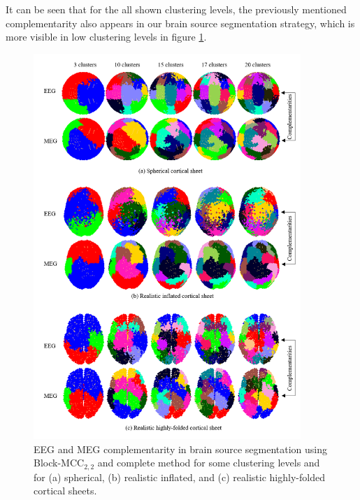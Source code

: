 It can be seen that for the all shown clustering levels, the previously mentioned complementarity also appears in our brain source segmentation strategy, which is more visible in low clustering levels in figure \ref{fig:EMEG_complementarities}.
\begin{figure}[!b]
\centering
\includegraphics[width=0.9\textwidth,keepaspectratio]{images/EMEG_complementarities.png} %
\centering
\caption{EEG and MEG complementarity in brain source segmentation using Block-MCC$_{2,2}$ and complete method for some clustering levels and for (a) spherical, (b) realistic inflated, and (c) realistic highly-folded cortical sheets.}
\label{fig:EMEG_complementarities}
\end{figure}
\FloatBarrier
